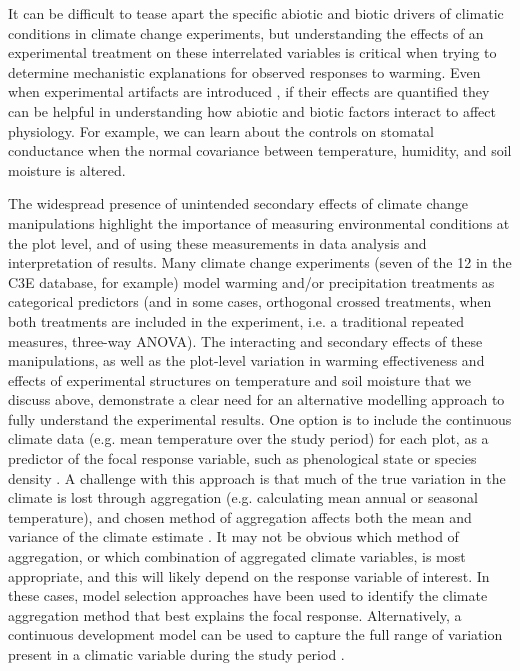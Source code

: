 \documentclass{article}
\begin{document}
\par It can be difficult to tease apart the specific abiotic and biotic drivers of climatic conditions in climate change experiments, but understanding the effects of an experimental treatment on these interrelated variables is critical when trying to determine mechanistic explanations for observed responses to warming. Even when experimental artifacts are introduced ,  if their effects are quantified they can be helpful in understanding how abiotic and biotic factors interact to affect physiology. For example, we can learn about the controls on stomatal conductance when the normal covariance between temperature, humidity, and soil moisture is altered. 
\par The widespread presence of unintended secondary effects of climate change manipulations highlight the importance of measuring environmental conditions at the plot level, and of using these measurements in data analysis and interpretation of results. Many climate change experiments (seven of the 12 in the C3E database, for example) model warming and/or precipitation treatments as categorical predictors (and in some cases, orthogonal crossed treatments, when both treatments are included in the experiment, i.e. a traditional repeated measures, three-way ANOVA). The interacting and secondary effects of these manipulations, as well as the plot-level variation in warming effectiveness and effects of experimental structures on temperature and soil moisture that we discuss above, demonstrate a clear need for an alternative modelling approach to fully understand the experimental results. One option is to include the continuous climate data (e.g. mean temperature over the study period) for each plot, as a predictor of the focal response variable, such as phenological state or species density \citep [e.g.][]{marchin2015, pelini2014}. A challenge with this approach is that much of the true variation in the climate is lost through aggregation (e.g. calculating mean annual or seasonal temperature), and chosen method of aggregation affects both the mean and variance of the climate estimate \citep [e.g.][]{clark2014b}. It may not be obvious which method of aggregation, or which combination of aggregated climate variables, is most appropriate, and this will likely depend on the response variable of interest. In these cases, model selection approaches have been used to identify the climate aggregation method that best explains the focal response\citep [e.g.][]{morin2010}. Alternatively, a continuous development model can be used to capture the full range of variation present in a climatic variable during the study period \citep [e.g.][]{clark2014b}.
\end{document}
